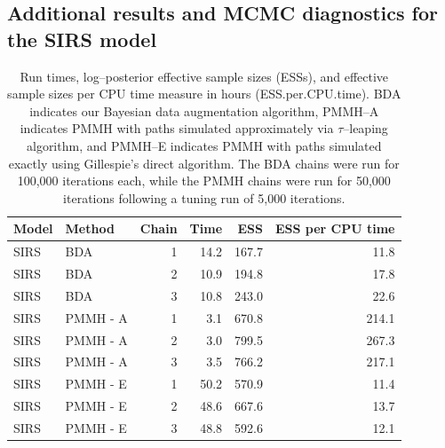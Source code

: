 \newpage
\subsection{Additional results and MCMC diagnostics for the SIRS model}

\begin{table}[htbp]
	\centering
	\begin{tabular}{llrrrr}
		\hline
		Model & Method & Chain & Time & ESS & ESS per CPU time \\ 
		\hline
		SIRS & BDA &  1 & 14.2 & 167.7 & 11.8 \\ 
		SIRS & BDA &  2 & 10.9 & 194.8 & 17.8 \\ 
		SIRS & BDA &  3 & 10.8 & 243.0 & 22.6 \\ 
		SIRS & PMMH - A &  1 & 3.1 & 670.8 & 214.1 \\ 
		SIRS & PMMH - A &  2 & 3.0 & 799.5 & 267.3 \\ 
		SIRS & PMMH - A &  3 & 3.5 & 766.2 & 217.1 \\ 
		SIRS & PMMH - E &  1 & 50.2 & 570.9 & 11.4 \\ 
		SIRS & PMMH - E &  2 & 48.6 & 667.6 & 13.7 \\ 
		SIRS & PMMH - E &  3 & 48.8 & 592.6 & 12.1 \\ 
		\hline
	\end{tabular}
	\caption[Simulation 1 SIRS model run times and log--posterior effective sample sizes.]{Run times, log--posterior effective sample sizes (ESSs), and effective sample sizes per CPU time measure in hours (ESS.per.CPU.time). BDA indicates our Bayesian data augmentation algorithm, PMMH--A indicates PMMH with paths simulated approximately via $ \tau $--leaping algorithm, and PMMH--E indicates PMMH with paths simulated exactly using Gillespie's direct algorithm. The BDA chains were run for 100,000 iterations each, while the PMMH chains were run for 50,000 iterations following a tuning run of 5,000 iterations.}
	\label{tab:sim1_sirs_ess}
\end{table}

